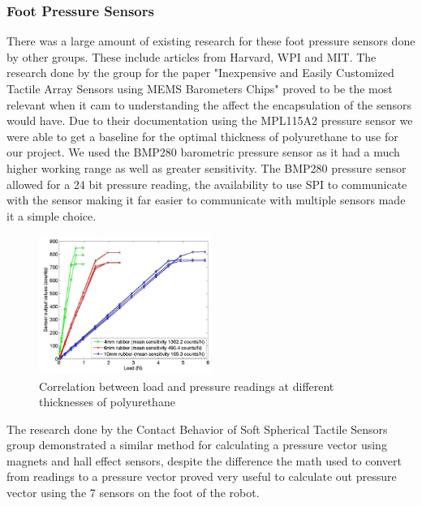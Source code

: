     \subsubsection{Foot Pressure Sensors}
    There was a large amount of existing research for these foot pressure sensors done by other groups. These include articles from Harvard\cite{chuah2012composite}\cite{chuah2014enabling}, WPI\cite{youssefian2014contact} and MIT\cite{tenzer2014inexpensive}. The research done by the group for the paper "Inexpensive and Easily Customized Tactile Array Sensors using MEMS Barometers Chips" \cite{chuah2012composite} proved to be the most relevant when it cam to understanding the affect the encapsulation of the sensors would have. Due to their documentation using the MPL115A2 pressure sensor we were able to get a baseline for the optimal thickness of polyurethane to use for our project. We used the BMP280 barometric pressure sensor \cite{BMP280} as it had a much higher working range as well as greater sensitivity. The BMP280 pressure sensor allowed for a 24 bit pressure reading, the availability to use SPI to communicate with the sensor making it far easier to communicate with multiple sensors made it a simple choice.
    \begin{figure}[H]
        \centering
        \includegraphics[width=0.5\textwidth]{figures/Load_vs_SensorvsThickness.png}
        \caption{Correlation between load and pressure readings at different thicknesses of polyurethane\cite{chuah2012composite}}
        \label{fig:ThicknessVSPressure}
    \end{figure}

    The research done by the Contact Behavior of Soft Spherical Tactile Sensors\cite{youssefian2014contact} group demonstrated a similar method for calculating a pressure vector using magnets and hall effect sensors, despite the difference the math used to convert from readings to a pressure vector proved very useful to calculate out pressure vector using the 7 sensors on the foot of the robot. 
